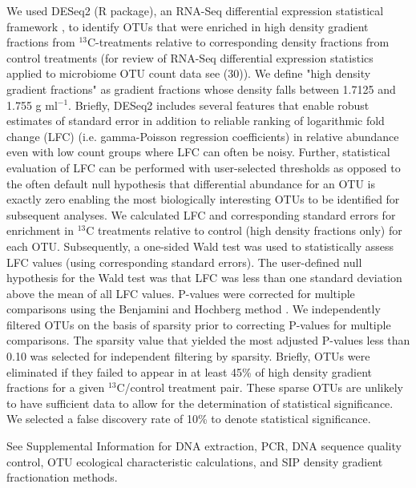 We used DESeq2 (R package), an RNA-Seq differential expression statistical
framework \citep{love2014}, to identify OTUs that were enriched in high
density gradient fractions from $^{13}$C-treatments relative to corresponding
density fractions from control treatments (for review of RNA-Seq differential
expression statistics applied to microbiome OTU count data see (30)). We define
"high density gradient fractions" as gradient fractions whose density falls
between 1.7125 and 1.755 g ml$^{-1}$. Briefly, DESeq2 includes several features that
enable robust estimates of standard error in addition to reliable ranking of
logarithmic fold change (LFC) (i.e. gamma-Poisson regression coefficients) in
relative abundance even with low count groups where LFC can often be noisy.
Further, statistical evaluation of LFC can be performed with user-selected
thresholds as opposed to the often default null hypothesis that differential
abundance for an OTU is exactly zero enabling the most biologically interesting
OTUs to be identified for subsequent analyses. We calculated LFC and
corresponding standard errors for enrichment in  $^{13}$C treatments relative
to control (high density fractions only) for each OTU. Subsequently,
a one-sided Wald test was used to statistically assess LFC values (using
corresponding standard errors). The user-defined null hypothesis for the Wald
test was that LFC was less than one standard deviation above the mean of all
LFC values. P-values were corrected for multiple comparisons using the
Benjamini and Hochberg method \citep{benjamini1995}. We independently filtered
OTUs on the basis of sparsity prior to correcting P-values for multiple
comparisons. The sparsity value that yielded the most adjusted P-values less
than 0.10 was selected for independent filtering by sparsity. Briefly, OTUs
were eliminated if they failed to appear in at least 45\% of high density
gradient fractions for a given $^{13}$C/control treatment pair. These sparse
OTUs are unlikely to have sufficient data to allow for the determination of
statistical significance. We selected a false discovery rate of 10\% to denote
statistical significance.

See Supplemental Information for DNA extraction, PCR, DNA sequence quality
control, OTU ecological characteristic calculations, and SIP density gradient
fractionation methods.
